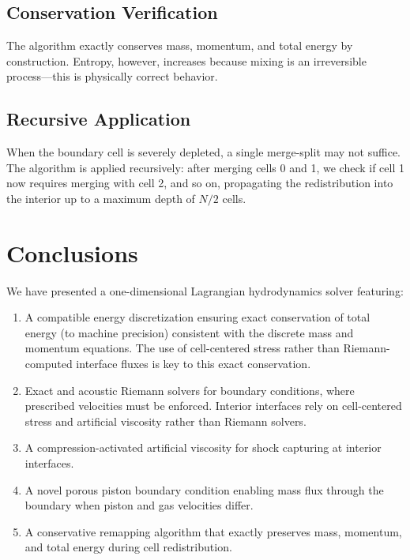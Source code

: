 \documentclass[12pt,a4paper]{article}
\begin{document}
\subsection{Conservation Verification}

The algorithm exactly conserves mass, momentum, and total energy by construction. Entropy, however, increases because mixing is an irreversible process---this is physically correct behavior.

\subsection{Recursive Application}

When the boundary cell is severely depleted, a single merge-split may not suffice. The algorithm is applied recursively: after merging cells 0 and 1, we check if cell 1 now requires merging with cell 2, and so on, propagating the redistribution into the interior up to a maximum depth of $N/2$ cells.

\section{Conclusions}
\label{sec:conclusions}

We have presented a one-dimensional Lagrangian hydrodynamics solver featuring:

\begin{enumerate}
    \item A compatible energy discretization ensuring exact conservation of total energy (to machine precision) consistent with the discrete mass and momentum equations. The use of cell-centered stress rather than Riemann-computed interface fluxes is key to this exact conservation.

    \item Exact and acoustic Riemann solvers for boundary conditions, where prescribed velocities must be enforced. Interior interfaces rely on cell-centered stress and artificial viscosity rather than Riemann solvers.

    \item A compression-activated artificial viscosity for shock capturing at interior interfaces.

    \item A novel porous piston boundary condition enabling mass flux through the boundary when piston and gas velocities differ.

    \item A conservative remapping algorithm that exactly preserves mass, momentum, and total energy during cell redistribution.
\end{enumerate}
\end{document}
